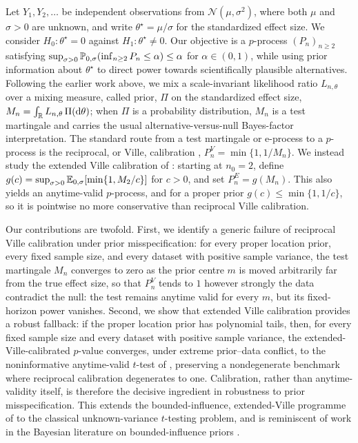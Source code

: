 \documentclass{article}
\begin{document}
Let $Y_1,Y_2,\ldots$ be independent observations from
$\mathcal N(\mu,\sigma^2)$, where both $\mu$ and $\sigma>0$ are unknown,
and write $\theta^\star=\mu/\sigma$ for the standardized effect size. We
consider $H_0:\theta^\star=0$ against $H_1:\theta^\star\neq0$. Our
objective is a $p$-process $(P_n)_{n\geq2}$ satisfying
$\sup_{\sigma>0}\mathbb{P}_{0,\sigma}(\inf_{n\geq2}P_n\leq\alpha)\leq\alpha$
for $\alpha\in(0,1)$, while using prior information about $\theta^\star$
to direct power towards scientifically plausible alternatives. Following
the earlier work above, we mix a scale-invariant likelihood ratio
$L_{n,\theta}$ over a mixing measure, called prior, $\Pi$ on the
standardized effect size, $M_n=\int_{\mathbb{R}} L_{n,\theta}\,\Pi(\mathrm{d}\theta)$;
when $\Pi$ is a probability distribution, $M_n$ is a test martingale and
carries the usual alternative-versus-null Bayes-factor interpretation.
The standard route from a test martingale or e-process to a $p$-process
is the reciprocal, or Ville, calibration
\citep{Ville1939,Shafer2011,Ramdas2023}, $P_n^V=\min\{1,1/M_n\}$. We
instead study the extended Ville calibration of \citet{Wang2025a}:
starting at $n_0=2$, define
$g(c)=\sup_{\sigma>0}\mathbb{E}_{0,\sigma}[\min\{1,M_2/c\}]$ for $c>0$, and set
$P_n^E=g(M_n)$. This also yields an anytime-valid $p$-process, and for a
proper prior $g(c)\leq\min\{1,1/c\}$, so it is pointwise no more
conservative than reciprocal Ville calibration.

Our contributions are twofold. First, we identify a generic failure of
reciprocal Ville calibration under prior misspecification: for every
proper location prior, every fixed sample size, and every dataset with
positive sample variance, the test martingale $M_n$ converges to zero as the prior centre $m$ is moved arbitrarily far from the true effect size, so that $P_n^V$ tends to $1$ however strongly the data contradict the null: the test remains anytime valid for every $m$, but its fixed-horizon power vanishes. Second, we show that extended Ville calibration provides a robust fallback: if the proper location prior has polynomial tails, then, for every fixed sample size and every dataset with positive sample variance, the extended-Ville-calibrated $p$-value converges, under extreme prior--data conflict, to the noninformative anytime-valid $t$-test of \citet{Lai1976}, preserving a nondegenerate benchmark where reciprocal calibration degenerates to one. Calibration, rather than anytime-validity itself, is therefore the decisive ingredient in robustness to prior misspecification. This extends the bounded-influence, extended-Ville programme of \citet{Cortinovis2025} to the classical unknown-variance $t$-testing problem, and is reminiscent of work in the Bayesian literature on bounded-influence priors
\citep{Dawid1973,Pericchi1992,Pericchi1995}.
\end{document}
